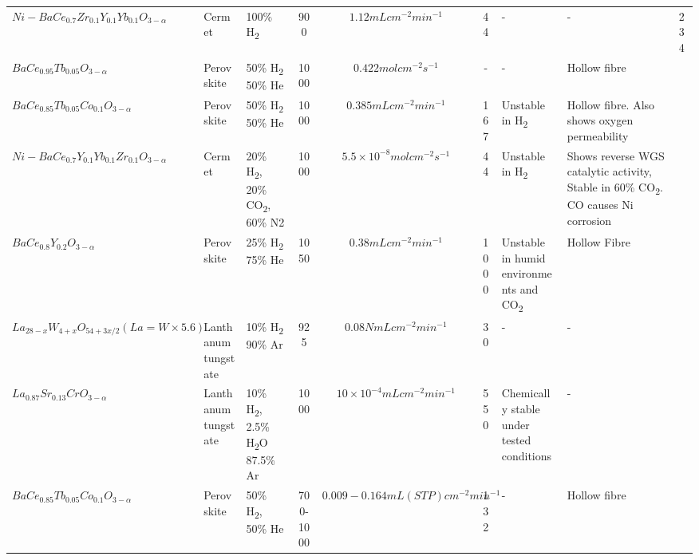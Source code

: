 \begin{longtable}{@{}C{5cm} C{2cm} C{4cm} ccc C{6cm} C{5cm} C{0.5cm} @{}}
\\ $Ni - BaCe_{0.7}Zr_{0.1}Y_{0.1}Yb_{0.1}O_{3-\alpha}$	
    & Cermet	
    & 100\% H\textsubscript{2}	
    & 900	
    & $1.12 mL cm^{-2} min^{-1}$	
    & 44	
    & -	
    & -	
    & 234

\\ $BaCe_{0.95}Tb_{0.05}O_{3-\alpha}$	
    & Perovskite	
    & 50\% H\textsubscript{2} 50\% He	
    & 1000	
    & $0.422 mol cm^{-2} s^{-1}$	
    & -	
    & -	
    & Hollow fibre	
    & \cite{Liu2013}

\\ $BaCe_{0.85}Tb_{0.05}Co_{0.1}O_{3-\alpha}$	
    & Perovskite	
    & 50\% H\textsubscript{2} 50\% He	
    & 1000	
    & $0.385 mL cm^{-2} min^{-1}$	
    & 167	
    & Unstable in H\textsubscript{2}	
    & Hollow fibre. Also shows oxygen permeability	
    & \cite{Song2013}

\\ $Ni-BaCe_{0.7}Y_{0.1}Yb_{0.1}Zr_{0.1}O_{3-\alpha}$	
    & Cermet	
    & 20\% H\textsubscript{2}, 20\% CO\textsubscript{2}, 60\% N2	
    & 1000	
    & $5.5 \times 10^{-8} mol cm^{-2} s^{-1}$
    & 44	
    & Unstable in H\textsubscript{2}	
    & Shows reverse WGS catalytic activity,	Stable in 60\% CO\textsubscript{2}. CO causes Ni corrosion
    & \cite{Fang2014, Fang2014a}

\\ $BaCe_{0.8}Y_{0.2}O_{3-\alpha}$	
    & Perovskite	
    & 25\% H\textsubscript{2} 75\% He	
    & 1050	
    & $0.38 mL cm^{-2} min^{-1}$	
    & 1000	
    & Unstable in humid environments and CO\textsubscript{2}
    & Hollow Fibre	
    & \cite{Tan2014}
    
\\ $La_{28-x}W_{4+x}O_{54+3x/2} (La=W \times 5.6)$	
    & Lanthanum tungstate	
    & 10\% H\textsubscript{2} 90\% Ar	
    & 925	
    & $0.08 NmL cm^{-2} min^{-1}$	
    & 30	
    & -	
    & -	
    & \cite{Gil2013}

\\ $La_{0.87}Sr_{0.13}CrO_{3-\alpha}$	
    & Lanthanum tungstate	
    & 10\% H\textsubscript{2}, 2.5\% H\textsubscript{2}O 87.5\% Ar	
    & 1000	
    & $10 \times 10^{-4} mL cm^{-2} min^{-1}$	
    & 550	
    & Chemically stable under tested conditions	
    & -	
    & \cite{Vigen2014}

\\ $BaCe_{0.85}Tb_{0.05}Co_{0.1}O_{3-\alpha}$	
    & Perovskite	
    & 50\% H\textsubscript{2}, 50\% He
    & 700-1000	
    & $0.009 - 0.164 mL (STP) cm^{-2} min^{-1}	$
    & 132	
    & -	
    & Hollow fibre	
    & \cite{Song2015a}


\end{longtable}
